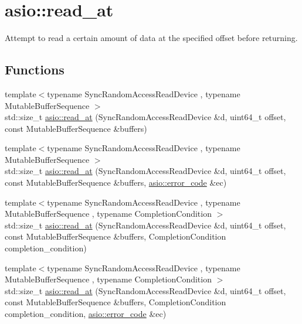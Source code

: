 \hypertarget{group__read__at}{}\section{asio\+:\+:read\+\_\+at}
\label{group__read__at}


Attempt to read a certain amount of data at the specified offset before returning.  


\subsection*{Functions}
\begin{DoxyCompactItemize}
\item 
{\footnotesize template$<$typename Sync\+Random\+Access\+Read\+Device , typename Mutable\+Buffer\+Sequence $>$ }\\std\+::size\+\_\+t \hyperlink{group__read__at_ga4ef7a26ff401494d673ad462a3f3f5c0}{asio\+::read\+\_\+at} (Sync\+Random\+Access\+Read\+Device \&d, uint64\+\_\+t offset, const Mutable\+Buffer\+Sequence \&buffers)
\item 
{\footnotesize template$<$typename Sync\+Random\+Access\+Read\+Device , typename Mutable\+Buffer\+Sequence $>$ }\\std\+::size\+\_\+t \hyperlink{group__read__at_ga6587e766e26325457154a5dac2a0b785}{asio\+::read\+\_\+at} (Sync\+Random\+Access\+Read\+Device \&d, uint64\+\_\+t offset, const Mutable\+Buffer\+Sequence \&buffers, \hyperlink{classasio_1_1error__code}{asio\+::error\+\_\+code} \&ec)
\item 
{\footnotesize template$<$typename Sync\+Random\+Access\+Read\+Device , typename Mutable\+Buffer\+Sequence , typename Completion\+Condition $>$ }\\std\+::size\+\_\+t \hyperlink{group__read__at_gaa16ebd52ad98e521ea4b75676d4db9fd}{asio\+::read\+\_\+at} (Sync\+Random\+Access\+Read\+Device \&d, uint64\+\_\+t offset, const Mutable\+Buffer\+Sequence \&buffers, Completion\+Condition completion\+\_\+condition)
\item 
{\footnotesize template$<$typename Sync\+Random\+Access\+Read\+Device , typename Mutable\+Buffer\+Sequence , typename Completion\+Condition $>$ }\\std\+::size\+\_\+t \hyperlink{group__read__at_ga88604242259da9fb0bacf3c4f0cc0002}{asio\+::read\+\_\+at} (Sync\+Random\+Access\+Read\+Device \&d, uint64\+\_\+t offset, const Mutable\+Buffer\+Sequence \&buffers, Completion\+Condition completion\+\_\+condition, \hyperlink{classasio_1_1error__code}{asio\+::error\+\_\+code} \&ec)

\end{DoxyCompactItemize}
